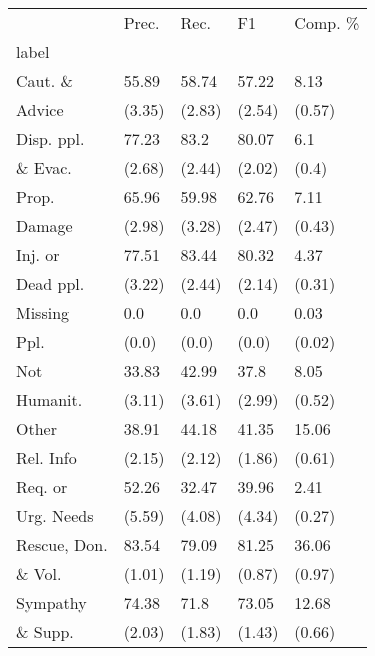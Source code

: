 \begin{tabular}{lllll}
\toprule
{} & Prec. &  Rec. &      F1 & Comp. \% \\
label                                  &           &         &         &               \\
\midrule
Caut. \&                     &     55.89 &   58.74 &   57.22 &          8.13 \\
Advice                                       &    (3.35) &  (2.83) &  (2.54) &        (0.57) \\
Disp. ppl.       &     77.23 &    83.2 &   80.07 &           6.1 \\
\& Evac.                                       &    (2.68) &  (2.44) &  (2.02) &         (0.4) \\
Prop.       &     65.96 &   59.98 &   62.76 &          7.11 \\
Damage                                       &    (2.98) &  (3.28) &  (2.47) &        (0.43) \\
Inj. or                 &     77.51 &   83.44 &   80.32 &          4.37 \\
Dead ppl.                                       &    (3.22) &  (2.44) &  (2.14) &        (0.31) \\
Missing                &       0.0 &     0.0 &     0.0 &          0.03 \\
Ppl.                                       &     (0.0) &   (0.0) &   (0.0) &        (0.02) \\
Not                       &     33.83 &   42.99 &    37.8 &          8.05 \\
Humanit.                                       &    (3.11) &  (3.61) &  (2.99) &        (0.52) \\
Other              &     38.91 &   44.18 &   41.35 &         15.06 \\
Rel. Info                                       &    (2.15) &  (2.12) &  (1.86) &        (0.61) \\
Req. or               &     52.26 &   32.47 &   39.96 &          2.41 \\
Urg. Needs                                       &    (5.59) &  (4.08) &  (4.34) &        (0.27) \\
Rescue, Don. &     83.54 &   79.09 &   81.25 &         36.06 \\
\& Vol.                                       &    (1.01) &  (1.19) &  (0.87) &        (0.97) \\
Sympathy                   &     74.38 &    71.8 &   73.05 &         12.68 \\
\& Supp.                                       &    (2.03) &  (1.83) &  (1.43) &        (0.66) \\
\bottomrule
\end{tabular}
